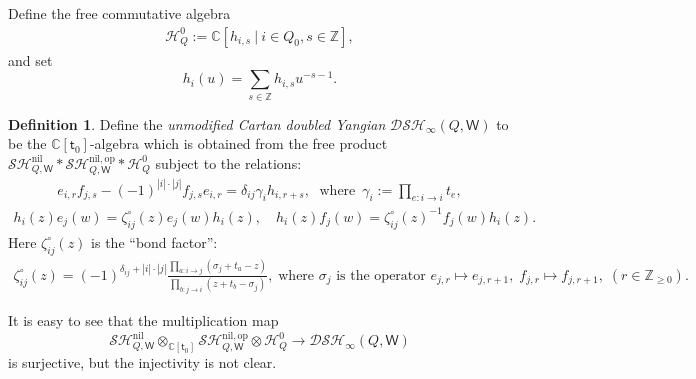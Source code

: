 \documentclass[10pt]{amsart}
\theoremstyle{definition}
\newtheorem{Definition}[Theorem]{Definition}
\numberwithin{equation}{section}
\newcommand{\bC}{\mathbb{C}}
\newcommand{\bZ}{\mathbb{Z}}
\newcommand{\bd}{\mathbf{d}}
\newcommand{\sT}{\mathsf{T}}
\newcommand{\sW}{\mathsf{W}}
\newcommand{\In}{\operatorname{in}}
\newcommand{\Out}{\operatorname{out}}
\begin{document}
Define the free commutative algebra
\begin{align*}
    \mathcal H^0_{Q}:=\bC\left[h_{i,s}\:\big|\: i\in Q_0,s\in \bZ\right],
\end{align*}
and set 
$$h_i(u)=\sum_{s\in \bZ}h_{i,s}u^{-s-1}. $$

\begin{Definition}
\label{def borel yangian}
Define the \textit{unmodified Cartan doubled Yangian} $\mathcal{DSH}_\infty(Q,\sW)$ to be the $\bC[\mathsf t_0]$-algebra which is obtained from the free product $\mathcal{SH}^{\mathrm{nil}}_{Q,\sW}*\mathcal{SH}^{\mathrm{nil},\mathrm{op}}_{Q,\sW}*\mathcal H^0_{Q}$ subject to the relations:
\begin{align}\label{ef rel}
    e_{i,r} f_{j,s}-(-1)^{|i|\cdot|j|}f_{j,s}e_{i,r} =\delta_{ij}\gamma_i h_{i,r+s},\,\,\;\text{where }\,\gamma_i:=\prod_{e:i\to i}t_e,
\end{align}
\begin{align}\label{he and hf rel}
h_i(z)e_j(w)=\zeta^{\circ}_{ij}(z)e_j(w)h_i(z),\quad h_i(z)f_j(w)=\zeta^{\circ}_{ij}(z)^{-1}f_j(w)h_i(z).
\end{align}
Here $\zeta^{\circ}_{ij}(z)$ is the ``bond factor'':
\begin{align*}
    \zeta^{\circ}_{ij}(z)=(-1)^{\delta_{ij}+|i|\cdot|j|}\frac{\prod_{a:i\to j}(\sigma_j+t_a-z)}{\prod_{b:j\to i}(z+t_b-\sigma_j)},\;\text{where $\sigma_j$ is the operator } e_{j,r}\mapsto e_{j,r+1},\; f_{j,r}\mapsto f_{j,r+1},\;(r\in \bZ_{\geqslant0}).
\end{align*}
\end{Definition}
It is easy to see that the multiplication map
$$\mathcal{SH}^{\mathrm{nil}}_{Q,\sW}\otimes_{\bC[\mathsf t_0]}\mathcal{SH}^{\mathrm{nil},\mathrm{op}}_{Q,\sW}\otimes\mathcal H^0_{Q}\to \mathcal{DSH}_\infty(Q,\sW)$$ is surjective, but 
the injectivity is not clear.
\end{document}
